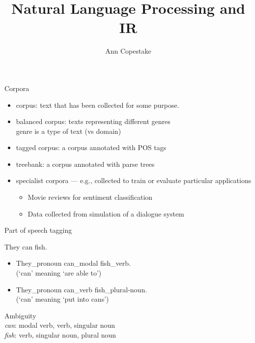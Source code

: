\documentclass{beamer}
\title{Natural Language Processing and IR}
\author{Ann Copestake}
\institute{FGV/EMAp}
\newcommand{\newterm}[1]{{\alert{#1}}}
\begin{document}
\begin{frame}{Corpora}

\begin{itemize}
\item \newterm{corpus}: text that has been collected
for some purpose.
\item \newterm{balanced corpus}: texts representing different genres\\
\newterm{genre} is a type of text (vs domain)
\item \newterm{tagged corpus}: a corpus annotated with POS tags
\item \newterm{treebank}: a corpus annotated with parse trees
\item specialist corpora --- e.g., collected to
train or evaluate particular applications
\begin{itemize}
\item Movie reviews for sentiment classification
\item Data collected from simulation of a dialogue system
\end{itemize}
\end{itemize}
\end{frame} 


\begin{frame}{Part of speech tagging}

They can fish.\\
\begin{itemize}
\item They\_pronoun can\_modal fish\_verb.\\
(`can' meaning `are able to')
\item They\_pronoun can\_verb fish\_plural-noun.\\
(`can' meaning `put into cans')
\end{itemize}
\newterm{Ambiguity}\\
{\it can}: modal verb, verb, singular noun\\
{\it fish}: verb, singular noun, plural noun
\end{frame}
\end{document}
